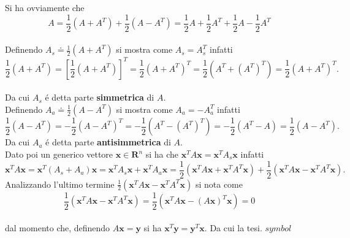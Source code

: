 Si ha ovviamente che
\[
A = \frac{1}{2}(A+A^T) + \frac{1}{2}(A-A^T)=\frac{1}{2}A + \frac{1}{2}A^T + \frac{1}{2}A - \frac{1}{2}A^T
\]
\\
Definendo $A_s \doteq \frac{1}{2}(A+A^T)$ si mostra come $A_s = A_s^T$ infatti
\[
\frac{1}{2}(A+A^T) = [ \frac{1}{2}(A+A^T)]^T = \frac{1}{2}(A+A^T)^T = \frac{1}{2}(A^T+(A^T)^T) = \frac{1}{2}(A+A^T)^T.
\]
\\
Da cui $A_s$ \'e detta parte \textbf{simmetrica} di $A$.
\\
Definendo $A_a \doteq \frac{1}{2}(A-A^T)$ si mostra come $A_a = -A_a^T$ infatti
\[
\frac{1}{2}(A-A^T) = -\frac{1}{2}(A-A^T)^T = -\frac{1}{2}(A^T-(A^T)^T) = -\frac{1}{2}(A^T-A) = \frac{1}{2}(A-A^T).
\]
Da cui $A_a$ \'e detta parte \textbf{antisimmetrica} di $A$.
\\
Dato poi un generico vettore $\mathbf{x} \in \mathbf{R}^n$ si ha che $\mathbf{x}^TA\mathbf{x} = \mathbf{x}^TA_s\mathbf{x}$ infatti
\[
\mathbf{x}^TA\mathbf{x} = \mathbf{x}^T(A_s + A_a)\mathbf{x} = \mathbf{x}^TA_s\mathbf{x} + \mathbf{x}^TA_a\mathbf{x} = \frac{1}{2}(\mathbf{x}^TA\mathbf{x} + \mathbf{x}^TA^T\mathbf{x}) + \frac{1}{2}(\mathbf{x}^TA\mathbf{x} - \mathbf{x}^TA^T\mathbf{x}).
\]
Analizzando l'ultimo termine $\frac{1}{2}(\mathbf{x}^TA\mathbf{x} - \mathbf{x}^TA^T\mathbf{x})$ si nota come
\[ \frac{1}{2}(\mathbf{x}^TA\mathbf{x} - \mathbf{x}^TA^T\mathbf{x}) = \frac{1}{2}(\mathbf{x}^TA\mathbf{x} - (A\mathbf{x})^T\mathbf{x})=0
\]
\\
dal momento che, definendo $A\mathbf{x}=\mathbf{y}$ si ha $\mathbf{x}^T\mathbf{y}= \mathbf{y}^T\mathbf{x}.$
Da cui la tesi.  $symbol$

